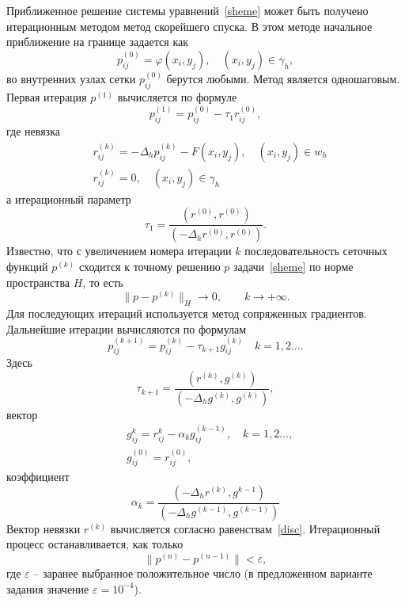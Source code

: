 \documentclass[11pt]{article}
\numberwithin{equation}{section}
\theoremstyle{plain}
\theoremstyle{definition}
\begin{document}
Приближенное решение системы уравнений~\eqref{sheme} может быть получено итерационным
методом метод скорейшего спуска. В этом методе начальное приближение на границе задается как
\[p_{ij}^{(0)}=\varphi(x_{i},y_{j}),\quad (x_{i},y_{j})\in\gamma_{h},\]
во внутренних узлах сетки \(p_{ij}^{(0)}\) берутся любыми. Метод является одношаговым.
Первая итерация \(p^{(1)}\) вычисляется по формуле
\[p_{ij}^{(1)}=p_{ij}^{(0)}-\tau_{1}r_{ij}^{(0)},\]
где невязка
\begin{equation}
\label{disc}
\begin{aligned}
&r_{ij}^{(k)}=-\Delta_{h}p_{ij}^{(k)}-F(x_i,y_j),\quad (x_{i},y_{j})\in w_{h}\\
&r_{ij}^{(k)}=0,\quad (x_i,y_j)\in\gamma_{h}
\end{aligned}
\end{equation}
а итерационный параметр
\[\tau_{1}=\dfrac{(r^{(0)},r^{(0)})}{(-\Delta_h r^{(0)},r^{(0)})}.\]
Известно, что с увеличением номера итерации \(k\) последовательность сеточных функций \(p^{(k)}\)
сходится к точному решению \(p\) задачи~\eqref{sheme} по норме пространства \(H\), то есть
\[\|p-p^{(k)}\|_{H}\rightarrow 0,\qquad k\rightarrow+\infty. \]
Для последующих итераций используется метод сопряженных градиентов.
Дальнейшие итерации вычисляются по формулам
\[p_{ij}^{(k+1)}=p_{ij}^{(k)}-\tau_{k+1}g_{ij}^{(k)}\quad k=1,2\ldots.\]
Здесь
\[\tau_{k+1}=\dfrac{(r^{(k)},g^{(k)})}{(-\Delta_h g^{(k)},g^{(k)})},\]
вектор
\[\begin{aligned}
&g_{ij}^{k}=r_{ij}^{k}-\alpha_{k}g_{ij}^{(k-1)},\quad k=1,2\ldots,\\
&g_{ij}^{(0)}=r_{ij}^{(0)},
\end{aligned}\]
коэффициент
\[\alpha_{k}=\dfrac{(-\Delta_{h}r^{(k)},g^{k-1})}{(-\Delta_h g^{(k-1)},g^{(k-1)})}\]
Вектор невязки \(r^{(k)}\) вычисляется согласно равенствам~\eqref{disc}. Итерационный процесс останавливается, как только
\[\|p^{(n)}-p^{(n-1)}\|<\varepsilon,\]
где \(\varepsilon\) – заранее выбранное положительное число (в предложенном
варианте задания значение \(\varepsilon=10^{-4}\)).
\end{document}
